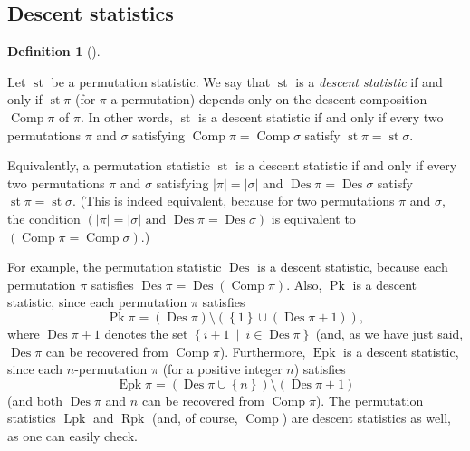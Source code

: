 \documentclass[numbers=enddot,12pt,final,onecolumn,notitlepage]{scrartcl}%
\theoremstyle{definition}
\newtheorem{defi}[theo]{Definition}
\newenvironment{definition}[1][]
{\begin{defi}[#1]\begin{leftbar}}
{\end{leftbar}\end{defi}}
\begin{document}
\subsection{Descent statistics}

\begin{definition}
Let $\operatorname*{st}$ be a permutation statistic. We say that
$\operatorname*{st}$ is a \textit{descent statistic} if and only if
$\operatorname*{st}\pi$ (for $\pi$ a permutation) depends only on the descent
composition $\operatorname*{Comp}\pi$ of $\pi$. In other words,
$\operatorname*{st}$ is a descent statistic if and only if every two
permutations $\pi$ and $\sigma$ satisfying $\operatorname*{Comp}%
\pi=\operatorname*{Comp}\sigma$ satisfy $\operatorname*{st}\pi
=\operatorname*{st}\sigma$.
\end{definition}

Equivalently, a permutation statistic $\operatorname*{st}$ is a descent
statistic if and only if every two permutations $\pi$ and $\sigma$ satisfying
$\left\vert \pi\right\vert =\left\vert \sigma\right\vert $ and
$\operatorname*{Des}\pi=\operatorname*{Des}\sigma$ satisfy $\operatorname*{st}%
\pi=\operatorname*{st}\sigma$. (This is indeed equivalent, because for two
permutations $\pi$ and $\sigma$, the condition $\left(  \left\vert
\pi\right\vert =\left\vert \sigma\right\vert \text{ and }\operatorname*{Des}%
\pi=\operatorname*{Des}\sigma\right)  $ is equivalent to $\left(
\operatorname*{Comp}\pi=\operatorname*{Comp}\sigma\right)  $.)

For example, the permutation statistic $\operatorname*{Des}$ is a descent
statistic, because each permutation $\pi$ satisfies $\operatorname*{Des}%
\pi=\operatorname*{Des}\left(  \operatorname*{Comp}\pi\right)  $. Also,
$\operatorname*{Pk}$ is a descent statistic, since each permutation $\pi$
satisfies%
\[
\operatorname*{Pk}\pi=\left(  \operatorname*{Des}\pi\right)  \setminus\left(
\left\{  1\right\}  \cup\left(  \operatorname*{Des}\pi+1\right)  \right)  ,
\]
where $\operatorname*{Des}\pi+1$ denotes the set $\left\{  i+1\ \mid
\ i\in\operatorname*{Des}\pi\right\}  $ (and, as we have just said,
$\operatorname*{Des}\pi$ can be recovered from $\operatorname*{Comp}\pi$).
Furthermore, $\operatorname*{Epk}$ is a descent statistic, since each
$n$-permutation $\pi$ (for a positive integer $n$) satisfies%
\[
\operatorname*{Epk}\pi=\left(  \operatorname*{Des}\pi\cup\left\{  n\right\}
\right)  \setminus\left(  \operatorname*{Des}\pi+1\right)
\]
(and both $\operatorname*{Des}\pi$ and $n$ can be recovered from
$\operatorname*{Comp}\pi$). The permutation statistics $\operatorname*{Lpk}$
and $\operatorname*{Rpk}$ (and, of course, $\operatorname*{Comp}$) are descent
statistics as well, as one can easily check.
\end{document}
